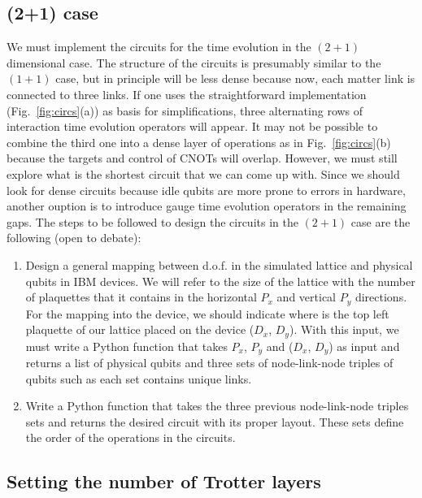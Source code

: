 \documentclass[a4paper]{article}
\begin{document}
\subsection{(2+1) case}

We must implement the circuits for the time evolution in the $(2+1)$ dimensional case. The structure of the circuits is presumably similar to the $(1+1)$ case, but in principle will be less dense because now, each matter link is connected to three links. If one uses the straightforward implementation (Fig.~\ref{fig:circs}(a)) as basis for simplifications, three alternating rows of interaction time evolution operators will appear. It may not be possible to combine the third one into a dense layer of operations as in Fig.~\ref{fig:circs}(b) because the targets and control of CNOTs will overlap. However, we must still explore what is the shortest circuit that we can come up with. Since we should look for dense circuits because idle qubits are more prone to errors in hardware, another ouption is to introduce gauge time evolution operators in the remaining gaps. The steps to be followed to design the circuits in the $(2+1)$ case are the following (open to debate):

\begin{enumerate}
    \item Design a general mapping between d.o.f. in the simulated lattice and physical qubits in IBM devices. We will refer to the size of the lattice with the number of plaquettes that it contains in the horizontal $P_x$ and vertical $P_y$ directions. For the mapping into the device, we should indicate where is the top left plaquette of our lattice placed on the device ($D_x$, $D_y$). With this input, we must write a Python function that takes $P_x$, $P_y$ and ($D_x$, $D_y$) as input and returns a list of physical qubits and three sets of node-link-node triples of qubits such as each set contains unique links.
    \item Write a Python function that takes the three previous node-link-node triples sets and returns the desired circuit with its proper layout. These sets define the order of the operations in the circuits.
\end{enumerate}

\subsection{Setting the number of Trotter layers}
\end{document}
